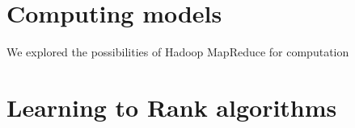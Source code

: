 \section{Computing models}
We explored the possibilities of Hadoop MapReduce for computation

\section{Learning to Rank algorithms}